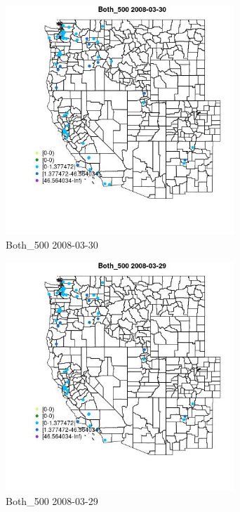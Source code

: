 \begin{figure} 
\centering  
\includegraphics[width=0.77\textwidth]{Code_Outputs/Report_ML_input_PM25_Step4_part_e_de_duplicated_aves_MapObsBoth_5002008-03-30.jpg} 
\caption{\label{fig:Report_ML_input_PM25_Step4_part_e_de_duplicated_avesMapObsBoth_5002008-03-30}Both_500 2008-03-30} 
\end{figure} 
 

\clearpage 

\begin{figure} 
\centering  
\includegraphics[width=0.77\textwidth]{Code_Outputs/Report_ML_input_PM25_Step4_part_e_de_duplicated_aves_MapObsBoth_5002008-03-29.jpg} 
\caption{\label{fig:Report_ML_input_PM25_Step4_part_e_de_duplicated_avesMapObsBoth_5002008-03-29}Both_500 2008-03-29} 
\end{figure} 
 

